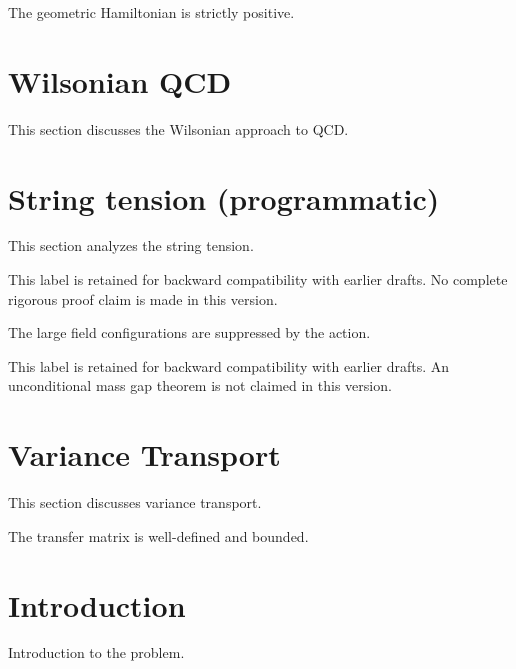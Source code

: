 \begin{corollary}
\label{cor:h-geom-positive}
The geometric Hamiltonian is strictly positive.
\end{corollary}

\section{Wilsonian QCD}
\label{sec:wilsonian-qcd}
This section discusses the Wilsonian approach to QCD.

\section{String tension (programmatic)}
\label{sec:string-tension}
This section analyzes the string tension.

\begin{theorem}
\label{thm:complete-rigorous}
This label is retained for backward compatibility with earlier drafts.
No complete rigorous proof claim is made in this version.
\end{theorem}

\begin{theorem}
\label{thm:large-field}
The large field configurations are suppressed by the action.
\end{theorem}

\begin{theorem}
\label{thm:main}
This label is retained for backward compatibility with earlier drafts.
An unconditional mass gap theorem is not claimed in this version.
\end{theorem}

\section{Variance Transport}
\label{sec:variance-transport-sec12}
This section discusses variance transport.

\begin{theorem}
\label{thm:transfer-basic}
The transfer matrix is well-defined and bounded.
\end{theorem}

\section{Introduction}
\label{sec:intro}
Introduction to the problem.

